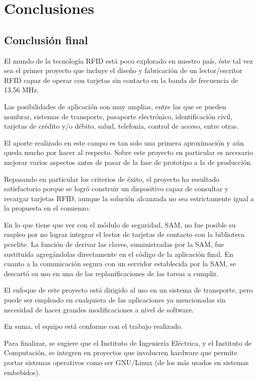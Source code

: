 \chapter{Conclusiones}

\section{Conclusión final}
El mundo de la tecnología RFID está poco explorado en nuestro país, éste 
tal vez sea el primer proyecto que incluye el diseño y fabricación de un 
lector/escritor RFID capaz de operar con tarjetas sin contacto en la banda de
frecuencia de 13,56 MHz.

Las posibilidades de aplicación son muy amplias, entre las que se pueden 
nombrar, sistemas de transporte, pasaporte electrónico, identificación 
civil, tarjetas de crédito y/o débito, salud, telefonía, control de acceso,
entre otras.

El aporte realizado en este campo es tan solo una primera aproximación y aún 
queda mucho por hacer al respecto. Sobre este proyecto en particular es
necesario mejorar varios aspectos antes de pasar de la fase de prototipo
a la de producción.

\bigskip
Repasando en particular los criterios de éxito, el proyecto ha resultado satisfactorio
porque se logró construir un dispositivo capaz de consultar y recargar tarjetas RFID,
aunque la solución alcanzada no sea estrictamente igual a la propuesta en el comienzo.

\bigskip
En lo que tiene que ver con el módulo de seguridad, SAM, no fue posible su empleo 
por no lograr integrar el lector de tarjetas de contacto con la biblioteca pcsclite.
La función de derivar las claves, suministradas por la SAM, fue sustituída agregándolas
directamente en el código de la aplicación final. En cuanto a la comunicación
segura con un servidor establecida por la SAM, se descartó su uso en una de 
las replanificaciones de las tareas a cumplir.

\bigskip
El enfoque de este proyecto está dirigido al uso en un sistema de transporte, pero 
puede ser empleado en cualquiera de las aplicaciones ya mencionadas sin necesidad
de hacer grandes modificaciones a nivel de software.

\bigskip
En suma, el equipo está conforme con el trabajo realizado.

\bigskip
Para finalizar, se sugiere que el Instituto de Ingeniería Eléctrica, y el Instituto de Computación, se integren en proyectos que involucren hardware que permite portar sistemas operativos como ser GNU/Linux (de los más usados en sistemas embebidos).

